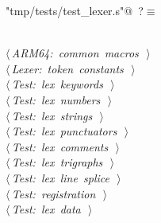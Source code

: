 \documentclass[11pt,a4paper,twoside,openright,DIV=15]{scrbook}
\theoremstyle{definition}
\theoremstyle{plain}
\theoremstyle{remark}
\begin{document}
\begin{flushleft} \small
\begin{minipage}{\linewidth}\label{scrap98}\raggedright\small
{} \verb@"tmp/tests/test_lexer.s"@\nobreak\ {\footnotesize {?}}$\equiv$
\vspace{-1ex}
\begin{list}{}{} \item
\mbox{}\verb@@\\
\mbox{}\verb@@\hbox{$\langle\,${\itshape ARM64: common macros}\nobreak\ {\footnotesize {}}$\,\rangle$}\verb@@\\
\mbox{}\verb@@\hbox{$\langle\,${\itshape Lexer: token constants}\nobreak\ {\footnotesize {}}$\,\rangle$}\verb@@\\
\mbox{}\verb@@\hbox{$\langle\,${\itshape Test: lex keywords}\nobreak\ {\footnotesize {}}$\,\rangle$}\verb@@\\
\mbox{}\verb@@\hbox{$\langle\,${\itshape Test: lex numbers}\nobreak\ {\footnotesize {}}$\,\rangle$}\verb@@\\
\mbox{}\verb@@\hbox{$\langle\,${\itshape Test: lex strings}\nobreak\ {\footnotesize {}}$\,\rangle$}\verb@@\\
\mbox{}\verb@@\hbox{$\langle\,${\itshape Test: lex punctuators}\nobreak\ {\footnotesize {}}$\,\rangle$}\verb@@\\
\mbox{}\verb@@\hbox{$\langle\,${\itshape Test: lex comments}\nobreak\ {\footnotesize {}}$\,\rangle$}\verb@@\\
\mbox{}\verb@@\hbox{$\langle\,${\itshape Test: lex trigraphs}\nobreak\ {\footnotesize {}}$\,\rangle$}\verb@@\\
\mbox{}\verb@@\hbox{$\langle\,${\itshape Test: lex line splice}\nobreak\ {\footnotesize {}}$\,\rangle$}\verb@@\\
\mbox{}\verb@@\hbox{$\langle\,${\itshape Test: registration}\nobreak\ {\footnotesize {}}$\,\rangle$}\verb@@\\
\mbox{}\verb@@\hbox{$\langle\,${\itshape Test: lex data}\nobreak\ {\footnotesize {}}$\,\rangle$}\verb@@\\
\mbox{}\verb@@{\NWsep}
\end{list}
\vspace{-1.5ex}
\footnotesize
\begin{list}{}{\setlength{\itemsep}{-\parsep}\setlength{\itemindent}{-\leftmargin}}

\item{}
\end{list}
\end{minipage}\vspace{4ex}
\end{flushleft}
\appendix
\end{document}
